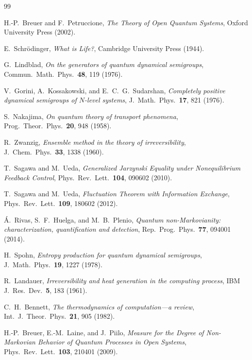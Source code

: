 \documentclass[12pt]{article}
\begin{document}
\begin{thebibliography}{99}

H.-P.~Breuer and F.~Petruccione,
\emph{The Theory of Open Quantum Systems},
Oxford University Press (2002).

E.~Schr\"odinger,
\emph{What is Life?},
Cambridge University Press (1944).

G.~Lindblad,
\emph{On the generators of quantum dynamical semigroups},
Commun.\ Math.\ Phys.\ \textbf{48}, 119 (1976).

V.~Gorini, A.~Kossakowski, and E.~C.~G.~Sudarshan,
\emph{Completely positive dynamical semigroups of $N$-level systems},
J.\ Math.\ Phys.\ \textbf{17}, 821 (1976).

S.~Nakajima,
\emph{On quantum theory of transport phenomena},
Prog.\ Theor.\ Phys.\ \textbf{20}, 948 (1958).

R.~Zwanzig,
\emph{Ensemble method in the theory of irreversibility},
J.\ Chem.\ Phys.\ \textbf{33}, 1338 (1960).

T.~Sagawa and M.~Ueda,
\emph{Generalized Jarzynski Equality under Nonequilibrium Feedback Control},
Phys.\ Rev.\ Lett.\ \textbf{104}, 090602 (2010).

T.~Sagawa and M.~Ueda,
\emph{Fluctuation Theorem with Information Exchange},
Phys.\ Rev.\ Lett.\ \textbf{109}, 180602 (2012).

\'{A}.~Rivas, S.~F.~Huelga, and M.~B.~Plenio,
\emph{Quantum non-Markovianity: characterization, quantification and detection},
Rep.\ Prog.\ Phys.\ \textbf{77}, 094001 (2014).

H.~Spohn,
\emph{Entropy production for quantum dynamical semigroups},
J.\ Math.\ Phys.\ \textbf{19}, 1227 (1978).

R.~Landauer,
\emph{Irreversibility and heat generation in the computing process},
IBM J.\ Res.\ Dev.\ \textbf{5}, 183 (1961).

C.~H.~Bennett,
\emph{The thermodynamics of computation---a review},
Int.\ J.\ Theor.\ Phys.\ \textbf{21}, 905 (1982).

H.-P.~Breuer, E.-M.~Laine, and J.~Piilo,
\emph{Measure for the Degree of Non-Markovian Behavior of Quantum Processes in Open Systems},
Phys.\ Rev.\ Lett.\ \textbf{103}, 210401 (2009).


\end{thebibliography}
\end{document}
